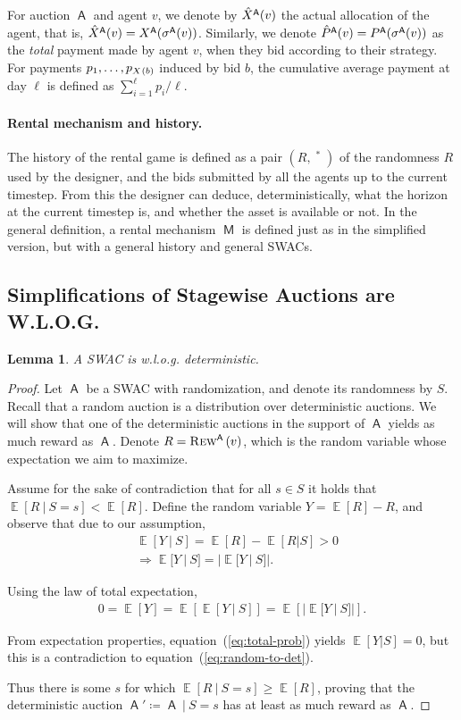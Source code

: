 \documentclass[11pt,letterpaper]{article}
\newcommand{\sqbr}[1]{\left[ #1 \right]}
\newcommand{\swac}{SWAC\xspace}
\newcommand{\swacs}{SWACs\xspace}
\newcommand{\reals}{\mathbb{R}}
\DeclareMathOperator*{\E}{\bb{E}}
\newcommand{\given}{\medspace | \medspace}
\DeclareMathOperator{\then}{\Longrightarrow}
\DeclareMathOperator{\preals}{\reals_{\geq0}}
\newcommand{\bb}[1]{\mathbb{#1}}
\DeclareMathOperator{\A}{\auc{A}}
\DeclareMathOperator{\M}{\mech{M}}
\newcommand{\insumi}[2]{\sum_{i={#1}}^{#2}}
\theoremstyle{plain}
\newtheorem{lemma}[theorem]{Lemma}
\newcommand{\auc}[1]{\mathsf{#1}}
\newcommand{\mech}[1]{\mathsf{#1}}
\begin{document}
For auction $\A$ and agent $v$, we denote by $\xhat[\A]{v}$ the actual allocation of the agent, that is, $\xhat[\A]{v}=\x[\A]{\sigma^{\A}(v)}$. Similarly, we denote $\phat[\A]{v}=\p[\A]{\sigma^{\A}(v)}$ as the \emph{total} payment made by agent $v$, when they bid according to their strategy. 
For payments $p_1,\dots,p_{\x{b}}$ induced by bid $b$, the cumulative average payment at day $\ell$ is defined as $\insumi{1}{\ell}p_i/\ell$.

\paragraph{Rental mechanism and history.} The history of the rental game is defined as  a pair $(R,\preals^\ast)$ of the randomness $R$ used by the designer, and the bids submitted by all the agents up to the current timestep. From this the designer can deduce, deterministically, what the horizon at the current timestep is, and whether the asset is available or not. In the general definition, a rental mechanism $\M$ is defined just as in the simplified version, but with a general history and general \swacs.

\subsection{Simplifications of Stagewise Auctions are W.L.O.G.}\label{app:simplification-are-wlog}

\begin{lemma}\label{lemma:auction_wlog_deterministic}
    A \swac is w.l.o.g.  
 deterministic.
\end{lemma}
\begin{proof}
    Let $\A$ be a \swac with randomization, and denote its randomness by $S$. Recall that a random auction is a distribution over deterministic auctions. We will show that one of the deterministic auctions in the support of $\A$ yields as much reward as $\A$. Denote $R=\trew[\A]{v}$, which is the random variable whose expectation we aim to maximize.
    
     Assume for the sake of contradiction that for all $s\in S$ it holds that $\E[R\given S=s]<\E[R]$. Define the random variable $Y=\E[R]-R$, and observe that due to  our assumption,
     \begin{align}
         &\E[Y\given S]=\E[R]-\E[R|S]>0\label{eq:random-to-det}\\
         &\then \E[Y\given S]=|\E[Y\given S]|.
     \end{align}

    Using the law of total expectation,     
     \begin{align}\label{eq:total-prob}
         0=\E[Y]=\E[\E[Y\given S]]=\E\sqbr{|\E[Y\given S]|}.
     \end{align}

    From expectation properties, equation~(\ref{eq:total-prob}) yields $\E[Y|S]=0$, but this is a contradiction to equation~(\ref{eq:random-to-det}).

    Thus there is some $s$ for which $\E[R\given S=s]\geq\E[R]$, proving that the deterministic auction $\A'\coloneq \A\given S=s$ has at least as much reward as $\A$.
\end{proof}
\end{document}
